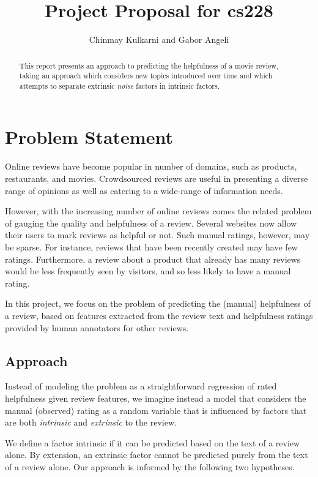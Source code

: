 \documentclass[12pt,letterpaper]{article}
\title{Project Proposal for cs228}
\author{Chinmay Kulkarni and Gabor Angeli}
\begin{document}
\maketitle

\begin{abstract}
This report presents an approach to predicting the helpfulness of a 
	movie review, taking an approach which considers new topics introduced over time
	and which attempts to separate extrinsic {\em noise} factors in intrinsic factors.
\end{abstract}


\section{Problem Statement}
Online reviews have become popular in number of domains, such as products, restaurants, and movies. Crowdsourced reviews are useful in presenting a diverse range of opinions as well as catering to a wide-range of information needs. 

However, with the increasing number of online reviews comes the related problem of gauging the quality and helpfulness of a review. Several websites now allow their users to mark reviews as helpful or not. Such manual ratings, however, may be sparse. For instance, reviews that have been recently created may have few ratings. Furthermore, a review about a product that already has many reviews would be less frequently seen by visitors, and so less likely to have a manual rating.  

In this project, we focus on the problem of predicting the (manual) helpfulness of a review, based on features extracted from the review text and  helpfulness ratings provided by human annotators for other reviews. 


\subsection{Approach}
Instead of modeling the problem as a straightforward regression of rated helpfulness given review features, we imagine instead a model that considers the manual (observed) rating as a random variable that is influenced by factors that are both {\em intrinsic} and {\em extrinsic} to the review. 

We define a factor intrinsic if it can be predicted based on the text of a review alone. By extension, an extrinsic factor cannot be predicted purely from the text of a review alone. Our approach is informed by the following two hypotheses. 
\end{document}

